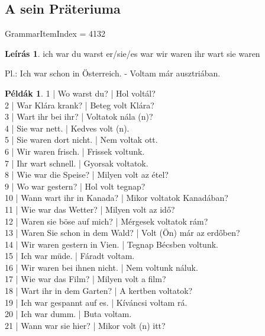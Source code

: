 \documentclass{article}
\theoremstyle{definition}
\newtheorem*{exmp}{Példák}
\newtheorem*{desc}{Leírás}
\begin{document}
\subsection{A sein Präteriuma}

GrammarItemIndex = 4132

\begin{desc}
ich war
du warst
er/sie/es war
wir waren
ihr wart
sie waren

Pl.: Ich war schon in Österreich. - Voltam már ausztriában.
\end{desc}

\begin{exmp}
1 | Wo warst du? | Hol voltál?\\
2 | War Klára krank? | Beteg volt Klára?\\
3 | Wart ihr bei ihr? | Voltatok nála (n)?\\
4 | Sie war nett. | Kedves volt (n).\\
5 | Sie waren dort nicht. | Nem voltak ott.\\
6 | Wir waren frisch. | Frissek voltunk.\\
7 | Ihr wart schnell. | Gyorsak voltatok.\\
8 | Wie war die Speise? | Milyen volt az étel?\\
9 | Wo war gestern? | Hol volt tegnap?\\
10 | Wann wart ihr in Kanada? | Mikor voltatok Kanadában?\\
11 | Wie war das Wetter? | Milyen volt az idő?\\
12 | Waren sie böse auf mich? | Mérgesek voltatok rám?\\
13 | Waren Sie schon in dem Wald? | Volt (Ön) már az erdőben?\\
14 | Wir waren gestern in Vien. | Tegnap Bécsben voltunk.\\
15 | Ich war müde. | Fáradt voltam.\\
16 | Wir waren bei ihnen nicht. | Nem voltunk náluk.\\
17 | Wie war das Film? | Milyen volt a film?\\
18 | Wart ihr in dem Garten? | A kertben voltatok?\\
19 | Ich war gespannt auf es. | Kíváncsi voltam rá.\\
20 | Ich war dumm. | Buta voltam.\\
21 | Wann war sie hier? | Mikor volt (n) itt?\\
\end{exmp}
\end{document}
